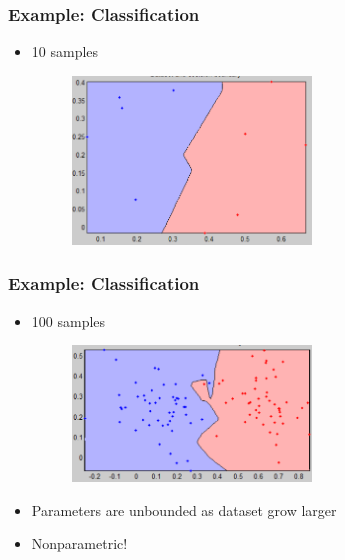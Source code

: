 \documentclass{beamer}
\begin{document}
\begin{frame}
	\frametitle{Example: Classification}
	\begin{itemize}
		\item 10 samples
		\begin{figure}		\includegraphics[width=0.6\textwidth]{img/knn10.png}
		\end{figure}
		
	\end{itemize}
\end{frame}
\begin{frame}
	\frametitle{Example: Classification}
	\begin{itemize}
		\item 100 samples
		\begin{figure}	
		\includegraphics[width=0.6\textwidth]{img/knn100.png}
		\end{figure}
		\item Parameters are unbounded as dataset grow larger
		\item Nonparametric!
	\end{itemize}
\end{frame}
\end{document}
